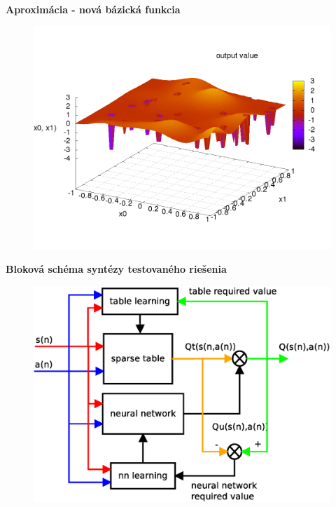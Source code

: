 \documentclass[xcolor=dvipsnames]{beamer}
\begin{document}
\begin{frame}{\bf Aproximácia - nová bázická funkcia}

\begin{figure}[!htb]
\centering
\includegraphics[scale=.4]{../pictures/peak_hill_function.png}
\end{figure}

\end{frame}



\begin{frame}{\bf Bloková schéma syntézy testovaného riešenia}

\begin{figure}[!htb]
\centering
\includegraphics[scale=.4]{../diagrams/q_learning_hybrid.eps}
\end{figure}

\end{frame}
\end{document}
